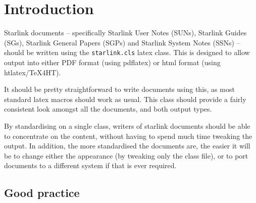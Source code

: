 \documentclass[twoside,11pt,nolof]{starlink}
\begin{document}
\scfrontmatter

\section{Introduction}
\label{sec:intro}

Starlink documents -- specifically Starlink User Notes (SUNs),
Starlink Guides (SGs), Starlink General Papers (SGPs) and Starlink
System Notes (SSNs) -- should be written using the
\texttt{starlink.cls} latex class. This is designed to allow output
into either PDF format (using pdflatex) or html format (using
htlatex/TeX4HT).


It should be pretty straightforward to write documents using this, as
most standard latex macros should work as usual. This class should
provide a fairly consistent look amongst all the documents, and both
output types.

By standardising on a single class, writers of starlink documents
should be able to concentrate on the content, without having to spend
much time tweaking the output. In addition, the more standardised the
documents are, the easier it will be to change either the appearance
(by tweaking only the class file), or to port documents to a different
system if that is ever required.

\subsection{Good practice}
\end{document}
